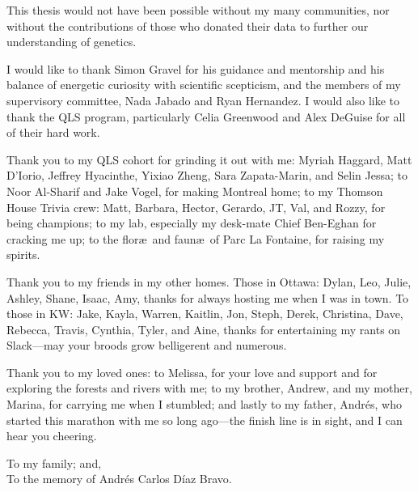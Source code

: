 This thesis would not have been possible without my many communities, nor without the contributions of those who donated their data to further our understanding of genetics.

I would like to thank Simon Gravel for his guidance and mentorship and his balance of energetic curiosity with scientific scepticism, and the members of my supervisory committee, Nada Jabado and Ryan Hernandez. I would also like to thank the QLS program, particularly Celia Greenwood and Alex DeGuise for all of their hard work.

Thank you to my QLS cohort for grinding it out with me: Myriah Haggard, Matt D'Iorio, Jeffrey Hyacinthe, Yixiao Zheng, Sara Zapata-Marin, and Selin Jessa; to Noor Al-Sharif and Jake Vogel, for making Montreal home; to my Thomson House Trivia crew: Matt, Barbara, Hector, Gerardo, JT, Val, and Rozzy, for being champions; to my lab, especially my desk-mate Chief Ben-Eghan for cracking me up; to the flor\ae ~and faun\ae ~of Parc La Fontaine, for raising my spirits.

Thank you to my friends in my other homes. Those in Ottawa: Dylan, Leo, Julie, Ashley, Shane, Isaac, Amy, thanks for always hosting me when I was in town. To those in KW: Jake, Kayla, Warren, Kaitlin, Jon, Steph, Derek, Christina, Dave, Rebecca, Travis, Cynthia, Tyler, and Aine, thanks for entertaining my rants on Slack---may your broods grow belligerent and numerous.

Thank you to my loved ones: to Melissa, for your love and support and for exploring the forests and rivers with me; to my brother, Andrew, and my mother, Marina, for carrying me when I stumbled; and lastly to my father, Andr\'{e}s, who started this marathon with me so long ago---the finish line is in sight, and I can hear you cheering.

\pagebreak
\hspace{0pt}
\vfill

\begin{center}
To my family; and, \\
To the memory of Andr\'{e}s Carlos D\'{i}az Bravo.
\end{center}

\vfill
\hspace{0pt}
\pagebreak
